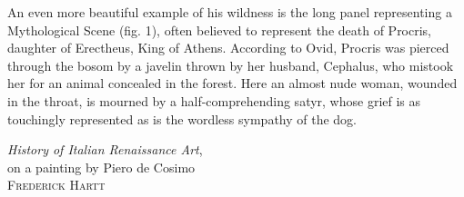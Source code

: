 \label{ch:oftenbelieved}
\begingroup
\setlength\epigraphwidth{9cm}
\epigraph{An even more beautiful example of his wildness is the long panel representing a Mythological Scene (fig. 1), often believed to represent the death of Procris, daughter of Erectheus, King of Athens. According to Ovid, Procris was pierced through the bosom by a javelin thrown by her husband, Cephalus, who mistook her for an animal concealed in the forest.  Here an almost nude woman, wounded in the throat, is mourned by a half-comprehending satyr, whose grief is as touchingly represented as is the wordless sympathy of the dog.}{\textit{History of Italian Renaissance Art},\\ on a painting by Piero de Cosimo\\ \textsc{Frederick Hartt}}
\endgroup

\settowidth{\versewidth}{Here an almost nude woman, wounded in the throat---}

